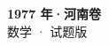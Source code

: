 \documentclass[zihao=-4, a4paper]{ctexart}
\begin{document}
\begin{center}
  {\Large\bfseries 1977 年·河南卷}\\[4pt]
  {\large 数学 · 试题版}
\end{center}
\medskip
{}

\end{document}
